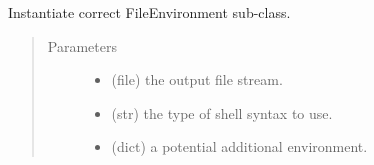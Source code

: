 \documentclass[a4paper,10pt,english]{sphinxmanual}
\begin{document}
\begin{fulllineitems}
\begin{fulllineitems}
\label{\detokenize{apidoc_src/src:src.fileEnviron.ScreenEnviron.run_env_script}}
\end{fulllineitems}


\begin{fulllineitems}
\label{\detokenize{apidoc_src/src:src.fileEnviron.ScreenEnviron.set}}
\end{fulllineitems}


\begin{fulllineitems}
\label{\detokenize{apidoc_src/src:src.fileEnviron.ScreenEnviron.write}}
\end{fulllineitems}


\end{fulllineitems}


\begin{fulllineitems}
\label{\detokenize{apidoc_src/src:src.fileEnviron.get_file_environ}}
Instantiate correct FileEnvironment sub-class.
\begin{quote}\begin{description}
\item[{Parameters}] \leavevmode\begin{itemize}
\item {} 
 \textendash{} (file) the output file stream.

\item {} 
 \textendash{} (str) the type of shell syntax to use.

\item {} 
 \textendash{} (dict) a potential additional environment.

\end{itemize}

\end{description}\end{quote}

\end{fulllineitems}
\end{document}
